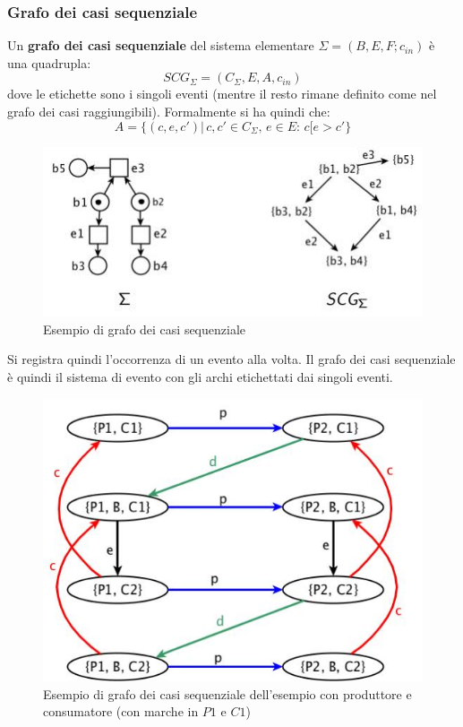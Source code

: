 \subsubsection{Grafo dei casi sequenziale}
\begin{definizione}
  Un \textbf{grafo dei casi sequenziale} del sistema elementare
  $\Sigma=(B, E, F;c_{in})$ è una quadrupla:
  \[SCG_\Sigma=(C_\Sigma, E, A, c_{in})\]
  dove le etichette sono i singoli eventi (mentre il resto rimane definito come
  nel grafo dei casi raggiungibili). Formalmente si ha quindi che:
  \[A=\{(c, e, c')|\, c, c'\in C_\Sigma,\, e\in E:\, c[e>c'\}\]
  \begin{figure}[H]
    \centering
    \includegraphics[scale = 0.6]{img/seq3.jpg}
    \caption{Esempio di grafo dei casi sequenziale}
  \end{figure}
  Si registra quindi l'occorrenza di un evento alla volta. Il grafo dei casi
  sequenziale è quindi il sistema di evento con gli archi etichettati dai
  singoli eventi.
  \begin{figure}[H]
    \centering
    \includegraphics[scale = 0.4]{img/seqq.jpg}
    \caption{Esempio di grafo dei casi sequenziale dell'esempio con produttore
      e consumatore (con marche in $P1$ e $C1$)}
  \end{figure}
\end{definizione} \vspace{5mm} %
